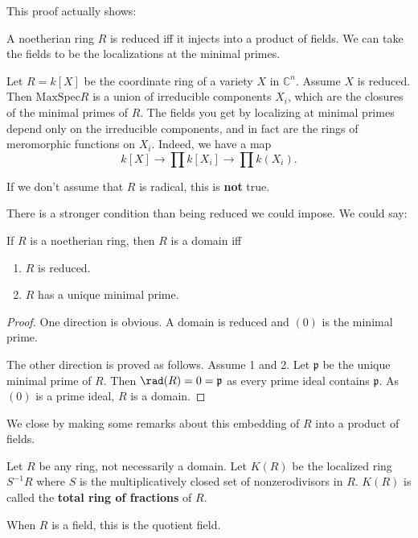 
This proof actually shows: 
\begin{proposition}[Scholism] A noetherian ring $R$ is reduced iff it injects
into a product of fields. We can take the fields to be the localizations at the
minimal primes. 
\end{proposition} 

\begin{example} 
Let $R = k[X]$ be the coordinate ring of a variety $X$ in $\mathbb{C}^n$. Assume $X$ is
reduced. Then $\mathrm{MaxSpec} R$ is a union of irreducible components $X_i$, which
are the closures of the minimal primes of $R$. The fields you get by localizing
at minimal primes depend only on the irreducible components, and in fact are
the rings of meromorphic functions on $X_i$. 
Indeed, we have a map
\[ k[X] \to \prod k[X_i] \to \prod k(X_i).  \]

If we don't assume that $R$ is radical, this is \textbf{not} true.
\end{example} 

There is a stronger condition than being reduced we could impose. We could say:

\begin{proposition} 
If $R$ is a noetherian ring, then $R$ is a domain iff 
\begin{enumerate}
\item $R$ is reduced. 
\item $R$ has a unique minimal prime.
\end{enumerate}
\end{proposition} 
\begin{proof} 
One direction is obvious. A domain is reduced and $(0)$ is the minimal prime. 

The other direction is proved as follows. Assume 1 and 2. Let $\mathfrak{p}$ be
the unique minimal prime of $R$. Then $\rad (R) = 0 = \mathfrak{p}$ as every
prime ideal contains $\mathfrak{p}$. As $(0)$ is a prime ideal, $R$ is a domain.
\end{proof} 

We close by making some remarks about this embedding of $R$ into a product of
fields. 

\begin{definition} 
Let $R$ be any ring, not necessarily a domain. Let $K(R)$ be the localized ring
$S^{-1}R$ where $S$ is the multiplicatively closed set of nonzerodivisors in
$R$.  $K(R)$ is called the \textbf{total ring of fractions} of $R$.

When $R$ is a field, this is the quotient field.
\end{definition} 

